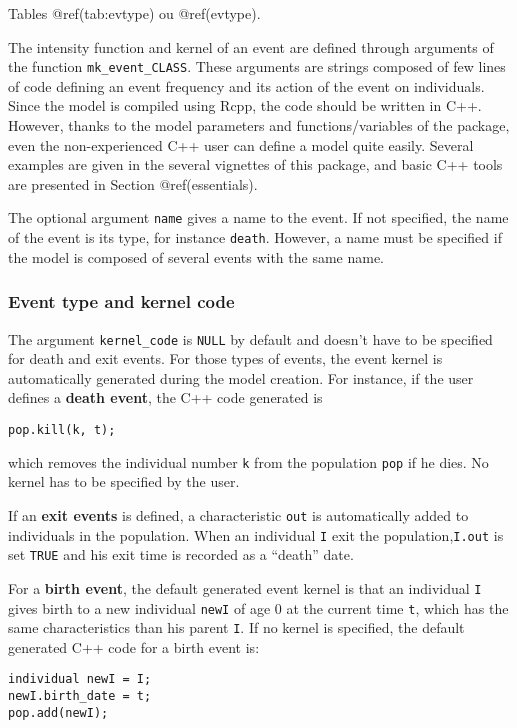 Tables @ref(tab:evtype) ou @ref(evtype).

The intensity function and kernel of an event are defined through arguments of the function \texttt{mk\_event\_CLASS}. These arguments are strings composed of few lines of code defining an event frequency and its action of the event on individuals. Since the model is compiled using Rcpp, the code should be written in C++. However, thanks to the model parameters and functions/variables of the package, even the non-experienced C++ user can define a model quite easily. Several examples are given in the several vignettes of this package, and basic C++ tools are presented in Section @ref(essentials).

The optional argument \texttt{name} gives a name to the event. If not specified, the name of the event is its type, for instance \texttt{death}. However, a name must be specified if the model is composed of several events with the same name.

\hypertarget{event-type-and-kernel-code}{%
\subsubsection{Event type and kernel code}\label{event-type-and-kernel-code}}

The argument \texttt{kernel\_code} is \texttt{NULL} by default and doesn't have to be specified for death and exit events. For those types of events, the event kernel is automatically generated during the model creation. For instance, if the user defines a \textbf{death event}, the C++ code generated is

\texttt{pop.kill(k,\ t);}

which removes the individual number \texttt{k} from the population \texttt{pop} if he dies. No kernel has to be specified by the user.

If an \textbf{exit events} is defined, a characteristic \texttt{out} is automatically added to individuals in the population. When an individual \texttt{I} exit the population,\texttt{I.out} is set \texttt{TRUE} and his exit time is recorded as a ``death'' date.

For a \textbf{birth event}, the default generated event kernel is that an individual \texttt{I} gives birth to a new individual \texttt{newI} of age 0 at the current time \texttt{t}, which has the same characteristics than his parent \texttt{I}. If no kernel is specified, the default generated C++ code for a birth event is:

\begin{verbatim}
individual newI = I; 
newI.birth_date = t;  
pop.add(newI); 
\end{verbatim}

